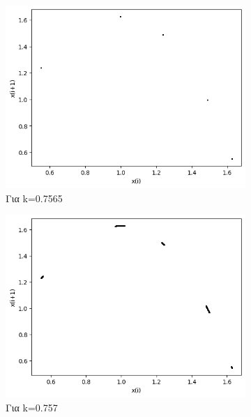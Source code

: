 \begin{figure}[h!]
\begin{subfigure}[b]{0.4\textwidth}
		\includegraphics[width=\textwidth]{LateX images/graphs q14/g21}
		\caption{Για k=0.7565}
		\label{f:k78}
	\end{subfigure}
	\hfill
	\begin{subfigure}[b]{0.4\textwidth}
		\centering
		\includegraphics[width=\textwidth]{LateX images/graphs q14/g22}
		\caption{Για k=0.757}
		\label{f:k79}
	\end{subfigure}
	\hfill	
	\begin{subfigure}[b]{0.4\textwidth}
		\centering

\end{subfigure}
\end{figure}
